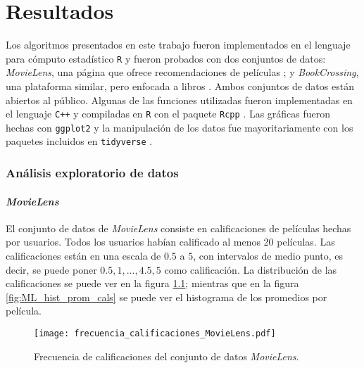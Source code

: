 
\chapter{Resultados}

Los algoritmos presentados en este trabajo fueron implementados en el lenguaje para cómputo estadístico \texttt{R} \cite{R_manual} y fueron probados con dos conjuntos de datos: \textit{MovieLens}, una página que ofrece recomendaciones de películas \cite{harper2016movielens}; y \textit{BookCrossing}, una plataforma similar, pero enfocada a libros \cite{ziegler2005improving}. Ambos conjuntos de datos están abiertos al público. Algunas de las funciones utilizadas fueron implementadas en el lenguaje \texttt{C++} y compiladas en \texttt{R} con el paquete \texttt{Rcpp} \cite{Rcpp_Book_Eddelbuettel} \cite{Rcpp_Article_Eddelbuettel_Francois}. Las gráficas fueron hechas con \texttt{ggplot2} \cite{wickham_ggplot2} y la manipulación de los datos fue mayoritariamente con los paquetes incluidos en \texttt{tidyverse} \cite{wickham_tidyverse}.

\subsection{Análisis exploratorio de datos}


\subsubsection{\textit{MovieLens}}

El conjunto de datos de \textit{MovieLens} consiste en  calificaciones de  películas hechas por  usuarios. Todos los usuarios habían calificado al menos 20 películas. Las calificaciones están en una escala de $0.5$ a $5$, con intervalos de medio punto, es decir, se puede poner $0.5, 1, \hdots, 4.5, 5$ como calificación. La distribución de las calificaciones se puede ver en la figura \ref{fig:ML_frec_calificaciones}; mientras que en la figura \ref{fig:ML_hist_prom_cals} se puede ver el histograma de los promedios por película.

\begin{figure}[H]
	\centering
 	\texttt{[image: frecuencia\_calificaciones\_MovieLens.pdf]}
 	\caption{Frecuencia de calificaciones del conjunto de datos \textit{MovieLens}.}
 	\label{fig:ML_frec_calificaciones}
\end{figure}


